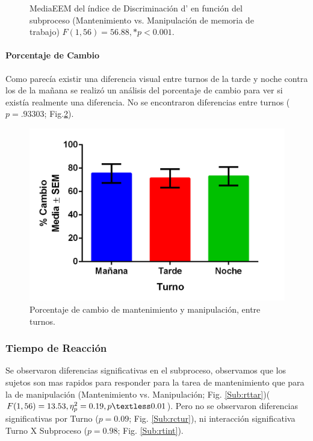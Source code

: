 \documentclass[12pt,letterpaper,final]{article}
\newcommand{\rpm}{\raisebox{.2ex}{$\scriptstyle\pm$}} %
\begin{document}
\begin{figure}[h]
	\caption{Media\rpm EEM del índice de Discriminación d’ en función del subproceso (Mantenimiento vs. Manipulación de memoria de trabajo) $F(1,56)= 56.88, *p <0.001.$}
	\label{fig:dprim}
\end{figure}

\paragraph{Porcentaje de Cambio}
Como parecía existir una diferencia visual entre turnos de la tarde y noche contra los de la mañana se realizó un análisis del porcentaje de cambio para ver si existía realmente una diferencia. No se encontraron diferencias entre turnos ($p=.93303$; Fig.\ref{fig:PCambio}).

\begin{figure}[h]

	\centering
	\includegraphics[scale=0.7]{graficas/PCambio.png}
	\caption{Porcentaje de cambio de mantenimiento y manipulación, entre turnos. }
	 	 
	\label{fig:PCambio}
\end{figure}


\subsubsection{Tiempo de Reacción}
Se observaron diferencias significativas en el subproceso, observamos que los sujetos son mas rapidos para responder para la tarea de mantenimiento que para la de manipulación (Mantenimiento vs. Manipulación; Fig. \ref{Sub:rttar})($F (1,56)= 13.53, \eta_{p}^{2}= 0.19, p\textless 0.01$). Pero no se observaron diferencias significativas por Turno ($p=0.09$; Fig. \ref{Sub:rctur}), ni interacción significativa Turno X Subproceso ($p=0.98$; Fig. \ref{Sub:rtint}).
\end{document}
